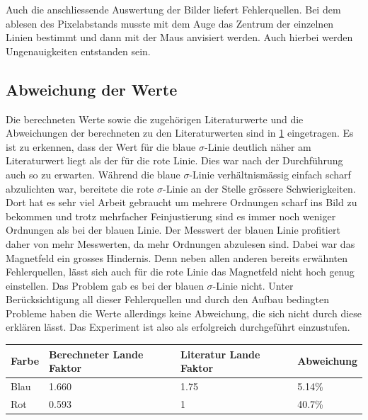 \noindent Auch die anschliessende Auswertung der Bilder liefert Fehlerquellen. Bei dem ablesen des Pixelabstands musste mit dem Auge das Zentrum der einzelnen Linien bestimmt und dann mit der Maus anvisiert werden. Auch hierbei werden Ungenauigkeiten entstanden sein. 

\subsection{Abweichung der Werte}

Die berechneten Werte sowie die zugehörigen Literaturwerte und die Abweichungen der berechneten zu den Literaturwerten sind in \ref{tab:Lande} eingetragen. Es ist zu erkennen, dass der Wert für die blaue $\sigma$-Linie deutlich näher am Literaturwert liegt als der für die rote Linie. Dies war nach der Durchführung auch so zu erwarten. Während die blaue $\sigma$-Linie verhältnismässig einfach scharf abzulichten war, bereitete die rote $\sigma$-Linie an der Stelle grössere Schwierigkeiten. Dort hat es sehr viel Arbeit gebraucht um mehrere Ordnungen scharf ins Bild zu bekommen und trotz mehrfacher Feinjustierung sind es immer noch weniger Ordnungen als bei der blauen Linie. Der Messwert der blauen Linie profitiert daher von mehr Messwerten, da mehr Ordnungen abzulesen sind. 
Dabei war das Magnetfeld ein grosses Hindernis. Denn neben allen anderen bereits erwähnten Fehlerquellen, lässt sich auch für die rote Linie das Magnetfeld nicht hoch genug einstellen. Das Problem gab es bei der blauen $\sigma$-Linie nicht. Unter Berücksichtigung all dieser Fehlerquellen und durch den Aufbau bedingten Probleme haben die Werte allerdings keine Abweichung, die sich nicht durch diese erklären lässt. Das Experiment ist also als erfolgreich durchgeführt einzustufen. 

\begin{minipage}{\linewidth}
    \begin{table}[H]
        \centering
    \begin{tabular}{llll}
        \toprule
        Farbe & Berechneter Lande Faktor & Literatur Lande Faktor & Abweichung \\
        \midrule
        Blau & 1.660 & 1.75 & 5.14\% \\
        Rot & 0.593 & 1 & 40.7\% \\
        \bottomrule   
    \end{tabular}
    
    \label{tab:Lande}
\end{table}
\end{minipage}

